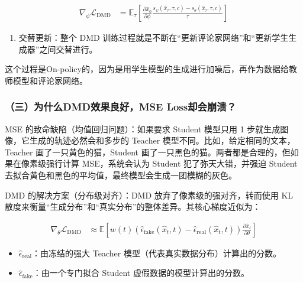 \[
\begin{aligned}
\nabla_\phi\mathcal{L}_{\mathrm{DMD}}
&=\mathbb{E}_{\tau}\left[
\frac{\partial\hat{x}_0}{\partial\phi}
\frac{s_\psi(\hat{x}_\tau,\tau,c)-s_\theta(\hat{x}_\tau,\tau,c)}{\tau}
\right]
\end{aligned}
\]

\begin{enumerate}
\def\labelenumi{\arabic{enumi}.}
\setcounter{enumi}{4}
\tightlist
\item
  交替更新：整个 DMD 训练过程就是不断在``更新评论家网络''和``更新学生生成器''之间交替进行。
\end{enumerate}

这个过程是On-policy的，因为是用学生模型的生成进行加噪后，再作为数据给教师模型和评论家网络。

\hypertarget{ux4e09ux4e3aux4ec0ux4e48dmdux6548ux679cux826fux597dmse-lossux5374ux4f1aux5d29ux6e83}{%
\subsubsection{（三）为什么DMD效果良好，MSE Loss却会崩溃？}\label{ux4e09ux4e3aux4ec0ux4e48dmdux6548ux679cux826fux597dmse-lossux5374ux4f1aux5d29ux6e83}}

MSE 的致命缺陷（均值回归问题）：如果要求 Student 模型只用 1 步就生成图像，它生成的轨迹必然会和多步的 Teacher 模型不同。比如，给定相同的文本，Teacher 画了一只黄色的猫，Student 画了一只黑色的猫。两者都是合理的，但如果在像素级强行计算 MSE，系统会认为 Student 犯了弥天大错，并强迫 Student 去拟合黄色和黑色的平均值，最终模型会生成一团模糊的灰色。

DMD 的解决方案（分布级对齐）：DMD 放弃了像素级的强对齐，转而使用 KL 散度来衡量``生成分布''和``真实分布''的整体差异。其核心梯度近似为：

\[
\begin{aligned}
\nabla_\theta\mathcal{L}_{\mathrm{DMD}}
&\approx
\mathbb{E}\left[
w(t)
\left(\hat{\epsilon}_{\mathrm{fake}}(\hat{x}_t,t)-\hat{\epsilon}_{\mathrm{real}}(\hat{x}_t,t)\right)
\frac{\partial\hat{x}_t}{\partial\theta}
\right]
\end{aligned}
\]

\begin{itemize}
\tightlist
\item
  \(\hat{\epsilon}_{\mathrm{real}}\)：由冻结的强大 Teacher 模型（代表真实数据分布）计算出的分数。
\item
  \(\hat{\epsilon}_{\mathrm{fake}}\)：由一个专门拟合 Student 虚假数据的模型计算出的分数。
\end{itemize}

